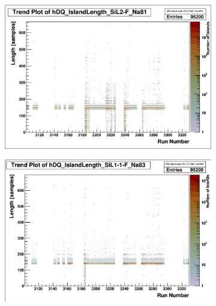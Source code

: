 \documentclass[a4paper]{article}
\begin{document}
\begin{figure}
  \centering
  \begin{subfigure}{0.5\textwidth}
    \includegraphics[width=0.9\linewidth]{figs/al50a/sil2f_length}
  \end{subfigure}%
  \begin{subfigure}{0.5\textwidth}
    \includegraphics[width=0.9\linewidth]{figs/al50a/sil11f_length}
  \end{subfigure}


\end{figure}
\end{document}
